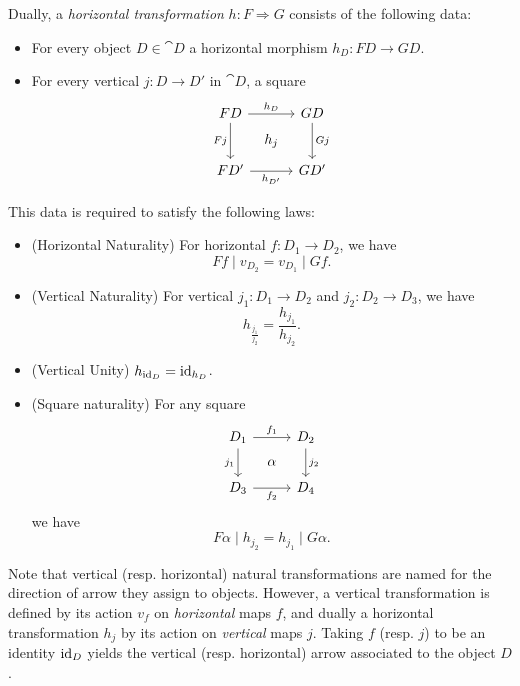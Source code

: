 \documentclass[DynamicalBook]{subfiles}
\begin{document}
\begin{definition}
Dually, a \emph{horizontal transformation} $h : F \Rightarrow G$ consists of the
following data:
\begin{itemize}
\item For every object $D \in \cat{D}$ a horizontal morphism $h_D : FD \to GD$.
\item For every vertical $j : D \to D'$ in $\cat{D}$, a square 
\[
        \begin{tikzcd}[sep=tiny]
          FD \ar[dd, "Fj"'] \ar[rr, "h_D"] & & GD
 \ar[dd, "Gj"] \\
           & h_j & \\
          FD' \ar[rr, "h_{D'}"'] & & GD'
        \end{tikzcd}
\]
\end{itemize}
This data is required to satisfy the following laws:
\begin{itemize}
\item (Horizontal Naturality) For horizontal $f : D_1 \to D_2$, we have
$$Ff \mid v_{D_2} = v_{D_1} \mid Gf.$$
\item (Vertical Naturality) For vertical $j_1 : D_1 \to D_2$ and $j_2 : D_2 \to
  D_3$, we have
$$h_{\frac{j_1}{j_2}} = \frac{h_{j_1}}{h_{j_2}}.$$
\item (Vertical Unity) $h_{\mathrm{id}_D} = \mathrm{id}_{h_D}$.
\item (Square naturality) For any square
\[
        \begin{tikzcd}[sep=tiny]
          D_1 \ar[dd, "j_1"'] \ar[rr, "f_1"] & & D_2
 \ar[dd, "j_2"] \\
           & \alpha & \\
          D_3 \ar[rr, "f_2"'] & & D_4
        \end{tikzcd}
\]
we have 
$$F\alpha \mid h_{j_2} = h_{j_1} \mid G\alpha.$$
\end{itemize}
\end{definition}

\begin{remark}
Note that vertical (resp. horizontal) natural transformations are named for
the direction of arrow they assign to objects. However, a vertical
transformation is defined by its action $v_f$ on \emph{horizontal} maps $f$, and dually a
horizontal transformation $h_j$ by its action on \emph{vertical} maps $j$.
Taking $f$ (resp. $j$) to be an identity $\mathrm{id}_D$ yields the vertical (resp.
horizontal) arrow associated to the object $D$.
\end{remark}
\end{document}
